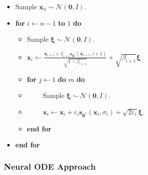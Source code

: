\documentclass[10pt]{article}
\newcommand{\ve}[1]{\mathbf{#1}}
\newcommand{\ves}[1]{\boldsymbol{#1}}
\newcommand{\mcal}[1]{\mathcal{#1}}
\begin{document}
\begin{itemize}
\begin{itemize}
    \begin{itemize}
      \item[] Sample $\ve{x}_n \sim \mcal{N}(\ve{0},I)$.
      \item[] {\bf for} $i \gets n-1$ {\bf to} $1$ {\bf do}
      \begin{itemize}
        \item[] Sample $\ves{\xi} \sim \mcal{N}(\ve{0}, I)$.
        \item[] $\ve{x}_{i} \gets \frac{\ve{x}_{i+1} + \beta_{i+1} \ve{s}_{\ves{\theta}^*}(\ve{x}_{i+1}, i+1)}{\sqrt{1 - \beta_{i+1}}} + \sqrt{\beta_{i+1}}\ves{\xi}$
        \item[] {\bf for} $j \gets 1$ {\bf do} $m$ {\bf do}        
        \item[] $\qquad$ Sample $\ves{\xi} \sim \mcal{N}(\ve{0}, I)$.
        \item[] $\qquad$ $\ve{x}_i \gets \ve{x}_i + \varepsilon_i \ve{s}_{\ves{\theta}^*}(\ve{x}_{i}, \sigma_{i}) + \sqrt{2 \varepsilon_i} \ves{\xi}$.
        \item[] {\bf end for}
      \end{itemize}
      \item[] {\bf end for}
    \end{itemize}
  \end{itemize}
\end{itemize}

\subsubsection{Neural ODE Approach}
\end{document}
